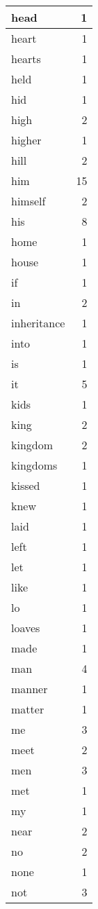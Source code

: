 \begin{center}
\begin{longtable}{l|r}
head & 1 \\ \hline
heart & 1 \\ \hline
hearts & 1 \\ \hline
held & 1 \\ \hline
hid & 1 \\ \hline
high & 2 \\ \hline
higher & 1 \\ \hline
hill & 2 \\ \hline
him & 15 \\ \hline
himself & 2 \\ \hline
his & 8 \\ \hline
home & 1 \\ \hline
house & 1 \\ \hline
if & 1 \\ \hline
in & 2 \\ \hline
inheritance & 1 \\ \hline
into & 1 \\ \hline
is & 1 \\ \hline
it & 5 \\ \hline
kids & 1 \\ \hline
king & 2 \\ \hline
kingdom & 2 \\ \hline
kingdoms & 1 \\ \hline
kissed & 1 \\ \hline
knew & 1 \\ \hline
laid & 1 \\ \hline
left & 1 \\ \hline
let & 1 \\ \hline
like & 1 \\ \hline
lo & 1 \\ \hline
loaves & 1 \\ \hline
made & 1 \\ \hline
man & 4 \\ \hline
manner & 1 \\ \hline
matter & 1 \\ \hline
me & 3 \\ \hline
meet & 2 \\ \hline
men & 3 \\ \hline
met & 1 \\ \hline
my & 1 \\ \hline
near & 2 \\ \hline
no & 2 \\ \hline
none & 1 \\ \hline
not & 3 \\ \hline

\end{longtable}
\end{center}
